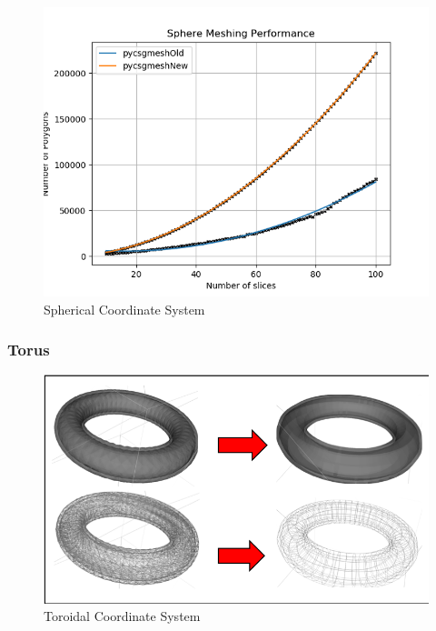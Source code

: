 \documentclass[12pt,a4paper]{article}
\begin{document}
\begin{figure}[h!]
\centering
\includegraphics[scale=0.5]{Images//Quad_fits//Sphere_quad.png}
\caption[width=\columnwidth]{Spherical Coordinate System}
\label{conts}
\end{figure}


\newpage
\subsubsection{Torus}

\begin{figure}[h!]
\centering
\includegraphics[scale=0.5]{Images//Meshes//torus.png}
\caption[width=\columnwidth]{Toroidal Coordinate System}
\label{conts}
\end{figure}
\end{document}
